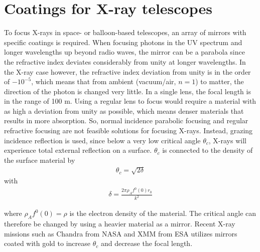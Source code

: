 \section{Coatings for X-ray telescopes}
To focus X-rays in space- or balloon-based telescopes, an array of mirrors with specific coatings is required. When focusing photons in the UV spectrum and longer wavelengths up beyond radio waves, the mirror can be a parabola since the refractive index deviates considerably from unity at longer wavelengths. In the X-ray case however, the refractive index deviation from unity is in the order of $-10^{-5}$, which means that from ambient (vacuum/air, $n=1$) to matter, the direction of the photon is changed very little. In a single lens, the focal length is in the range of 100 m. Using a regular lens to focus would require a material with as high a deviation from unity as possible, which means denser materials that results in more absorption. So, normal incidence parabolic focusing and regular refractive focusing are not feasible solutions for focusing X-rays. Instead, grazing incidence reflection is used, since below a very low critical angle $\theta_c$, X-rays will experience total external reflection on a surface\cite{AlsNielsen:2001vt}. $\theta_c$ is connected to the density of the surface material by
\begin{eqnarray}
	\theta_c = \sqrt{2\delta}
\end{eqnarray}
with
\begin{eqnarray}
	\delta = \frac{2\pi \rho_A f^0 (0) r_0}{k^2}
\end{eqnarray}

where $\rho_A f^0 (0)=\rho$ is the electron density of the material. The critical angle can therefore be changed by using a heavier material as a mirror. Recent X-ray missions such as Chandra from NASA and XMM from ESA utilizes mirrors coated with gold to increase $\theta_c$ and decrease the focal length.


